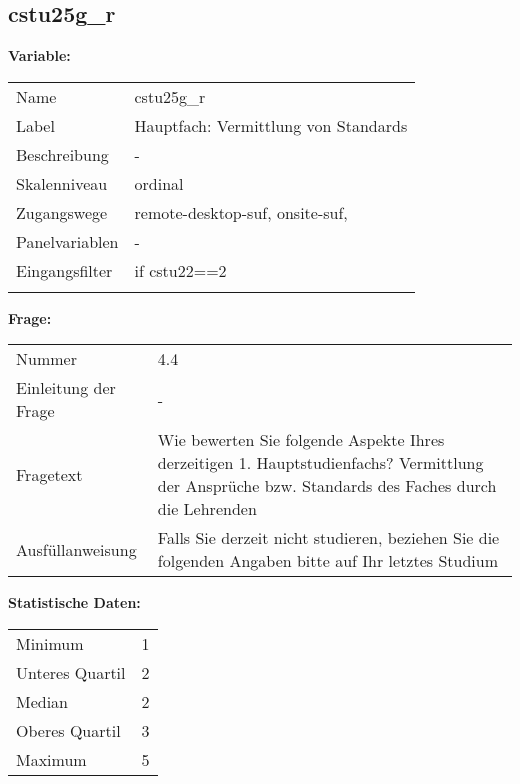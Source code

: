 	
	
	\subsection{cstu25g\_r}
	\label{subSection:cstu25g_r}

	\noindent\textbf{Variable:}\\
		\begin{tabular}{lL{11.3cm}}
			\label{tableVariable:cstu25g_r}
			Name & cstu25g\_r \\
			Label & Hauptfach: Vermittlung von Standards \\
			Beschreibung & - \\
			Skalenniveau & ordinal \\
			Zugangswege &
				remote-desktop-suf,
				onsite-suf,
 \\
			Panelvariablen & -
			 \\
			Eingangsfilter & if cstu22==2 \\
 \\
		\end{tabular}

		\vspace*{1 cm}
		\noindent\textbf{Frage:}\\
		\begin{tabular}{lL{11.3cm}}
			\label{tableQuestion:cstu25g_r}
			Nummer & 4.4 \\
			Einleitung der Frage & - \\
			Fragetext & Wie bewerten Sie folgende Aspekte Ihres derzeitigen 1. Hauptstudienfachs?
Vermittlung der Ansprüche bzw. Standards des Faches durch die Lehrenden \\
			Ausfüllanweisung & Falls Sie derzeit nicht studieren, beziehen Sie die folgenden Angaben bitte auf Ihr letztes Studium \\
		\end{tabular}


		\vspace*{1 cm}
		\noindent\textbf{Statistische Daten:}\\
			\begin{tabular}{ll}
				\label{tableStatistics:cstu25g_r}
					Minimum & 1 \\
					Unteres Quartil & 2 \\
					Median & 2 \\
					Oberes Quartil & 3 \\
					Maximum & 5 \\
			\end{tabular}



